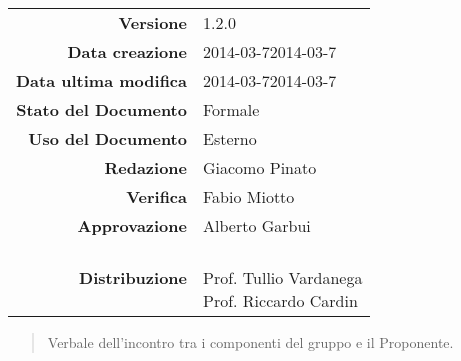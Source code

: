 
\newcommand{\Versione}{1.2.0}						%
\newcommand{\Data}{2014-03-7}						%
\newcommand{\DataUltimaModifica}{2014-03-7}
\newcommand{\TipoDocumento}{Verbale esterno 2014-03-5}		%




\begin{center}
\begin{tabular}{r|l}
\textbf{Versione} & \Versione{} \\
\textbf{Data creazione} & \Data{2014-03-7} \\
\textbf{Data ultima modifica} & \DataUltimaModifica{2014-03-7} \\
\textbf{Stato del Documento} & Formale \\		%
\textbf{Uso del Documento} & Esterno \\			%
\textbf{Redazione} & Giacomo Pinato\\				%
\textbf{Verifica} & Fabio Miotto\\		%
\textbf{Approvazione} & Alberto Garbui \\		%
\textbf{Distribuzione} & \parbox[t]{4cm}{\NomeGruppo{} \\Prof. Tullio Vardanega \\ Prof. Riccardo Cardin \\ \Prop{} }\\
\end{tabular}
\end{center}

\vspace{0.05in}

\begin{abstract}
\begin{center}
Verbale dell'incontro tra i componenti del gruppo \NomeGruppo{} e il Proponente.
\end{center}
\end{abstract}

